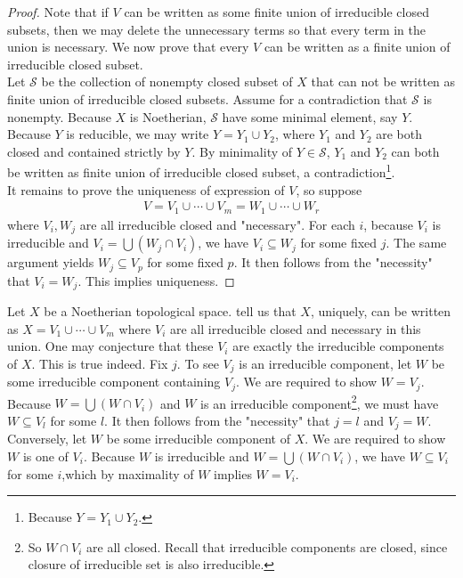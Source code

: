 \documentclass{report}
\begin{document}
\begin{proof}
Note that if $V$ can be written as some finite union of irreducible closed subsets, then we may delete the unnecessary terms so that every term in the union is necessary. We now prove that every $V$ can be written as a finite union of irreducible closed subset.\\  

Let $\mathscr{S}$ be the collection of nonempty closed subset of $X$ that can not be written as finite union of irreducible closed subsets. Assume for a contradiction that $\mathscr{S}$ is nonempty. Because $X$ is Noetherian, $\mathscr{S}$ have some minimal element, say $Y$. Because $Y$ is reducible, we may write $Y=Y_1\cup Y_2$, where $Y_1$ and $Y_2$ are both closed and contained strictly by $Y$. By minimality of $Y \in \mathscr{S}$, $Y_1$ and  $Y_2$ can both be written as finite union of irreducible closed subset, a contradiction\footnote{Because $Y=Y_1 \cup  Y_2$.}. \\

It remains to prove the uniqueness of expression of $V$, so suppose 
\begin{align*}
V= V_1 \cup  \cdots \cup  V_m = W_1 \cup  \cdots \cup  W_r
\end{align*}
where $V_i,W_j$ are all irreducible closed and "necessary". For each $i$, because $V_i$ is irreducible and $V_i = \bigcup (W_j \cap V_i)$, we have $V_i \subseteq W_j$ for some fixed $j$. The same argument yields $W_j\subseteq V_p$ for some fixed $p$. It then follows from the "necessity" that $V_i=W_j$. This implies uniqueness. 
\end{proof}
Let $X$ be a Noetherian topological space.  tell us that $X$, uniquely, can be written as  $X=V_1\cup  \cdots \cup V_m$ where $V_i$ are all irreducible closed and necessary in this union. One may conjecture that these $V_i$ are exactly the irreducible components of $X$. This is true indeed. Fix $j$. To see  $V_j$ is an irreducible component, let $W$ be some irreducible component containing  $V_j$. We are required to show $W=V_j$. Because $W= \bigcup (W\cap V_i)$ and $W$ is an irreducible component\footnote{So $W\cap V_i$ are all closed. Recall that irreducible components are closed, since closure of irreducible set is also irreducible.}, we must have $W\subseteq V_l$ for some $l$. It then follows from the "necessity" that $j=l$ and  $V_j=W$. Conversely, let $W$ be some irreducible component of  $X$. We are required to show $W$ is one of $V_i$. Because $W$ is irreducible and  $W=\bigcup (W\cap V_i)$, we have $W \subseteq V_i$ for some $i$,which by maximality of $W$ implies  $W=V_i$.\\
\end{document}
